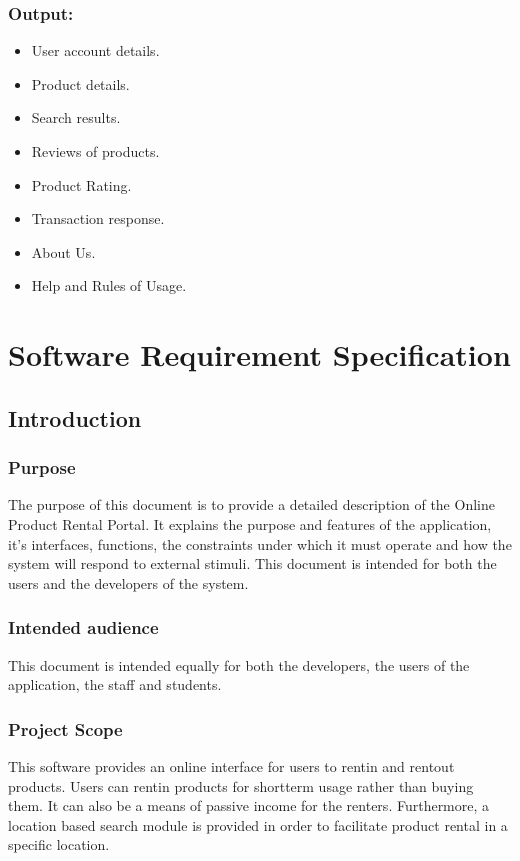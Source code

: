 \documentclass[11pt]{report}
\begin{document}
\subsection{\textbf{Output:}} %
\begin{itemize}
  \item User account details.
  \item Product details.
  \item Search results.
  \item Reviews of products.
  \item Product Rating.
  \item Transaction response.
  \item About Us.
  \item Help and Rules of Usage.
\end{itemize}

 
\chapter {Software Requirement Specification}
\label{srs}


\section{Introduction}
\subsection{Purpose}
The purpose of this document is to provide a detailed description of the Online Product Rental Portal. It 
explains the purpose and features of the application, it's interfaces, functions, the constraints under which it 
must operate and how the system will respond to external stimuli. This document is intended for both the 
users and the developers of the system.
\subsection{Intended audience}
This document is intended equally for both the developers, the users of the application, the staff and 
students.
\subsection{Project Scope}
This software provides an online interface for users to rent­in and rent­out products. Users can rent­in 
products for short­term usage rather than buying them. It can also be a means of passive income for the 
renters. Furthermore, a location based search module is provided in order to facilitate product rental in a 
specific location.
\end{document}
